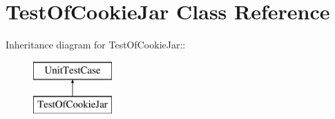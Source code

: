 \hypertarget{class_test_of_cookie_jar}{
\section{TestOfCookieJar Class Reference}
\label{class_test_of_cookie_jar}
}
Inheritance diagram for TestOfCookieJar::\begin{figure}[H]
\begin{center}
\leavevmode
\includegraphics[height=2cm]{class_test_of_cookie_jar}
\end{center}
\end{figure}
